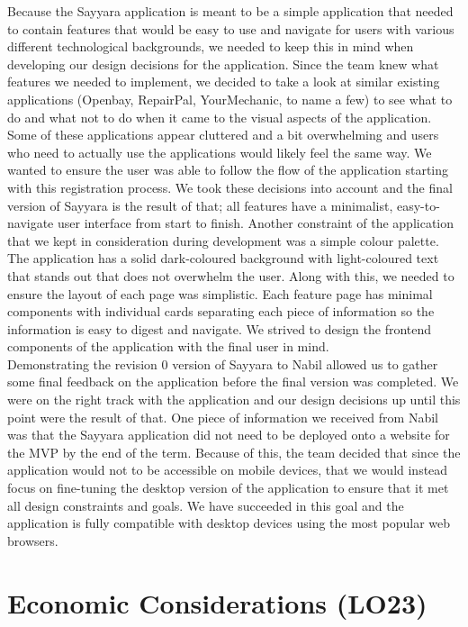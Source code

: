 \documentclass{article}
\begin{document}
\noindent Because the Sayyara application is meant to be a simple application that needed to contain features that would be easy to use and navigate for
users with various different technological backgrounds, we needed to keep this in mind when developing our design decisions for the application. Since the
team knew what features we needed to implement, we decided to take a look at similar existing applications (Openbay, RepairPal, YourMechanic, to name a few)
to see what to do and what not to do when it came to the visual aspects of the application. Some of these applications appear cluttered and a bit
overwhelming and users who need to actually use the applications would likely feel the same way. We wanted to ensure the user was able to follow the flow of
the application starting with this registration process. We took these decisions into account and the final version of Sayyara is the result of that; all
features have a minimalist, easy-to-navigate user interface from start to finish. 
\noindent Another constraint of the application that we kept in consideration during development was a simple colour palette. The application has a solid
dark-coloured background with light-coloured text that stands out that does not overwhelm the user. Along with this, we needed to ensure the layout of each
page was simplistic. Each feature page has minimal components with individual cards separating each piece of information so the information is easy to
digest and navigate. We strived to design the frontend components of the application with the final user in mind. \\

\noindent Demonstrating the revision 0 version of Sayyara to Nabil allowed us to gather some final feedback on the application before the final version was
completed. We were on the right track with the application and our design decisions up until this point were the result of that. One piece of information we
received from Nabil was that the Sayyara application did not need to be deployed onto a website for the MVP by the end of the term. Because of this, the
team decided that since the application would not to be accessible on mobile devices, that we would instead focus on fine-tuning the desktop version of the
application to ensure that it met all design constraints and goals. We have succeeded in this goal and the application is fully compatible with desktop
devices using the most popular web browsers.\\

\section{Economic Considerations (LO23)}
\end{document}
